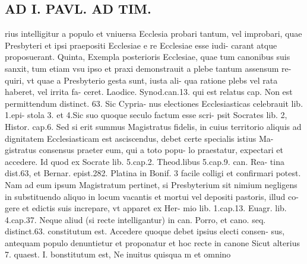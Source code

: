 \documentclass{article}
\begin{document}
\begin{pages}
\section*{AD I. PAVL. AD TIM. }
\marginpar{[ p.113 ]}\pstart rius intelligitur a populo et vniuersa Ecclesia probari tantum, vel improbari, quae Presbyteri et ipsi praepositi Ecclesiae e re Ecclesiae esse iudi- carant atque proposuerant. Quinta, Exempla posterioris Ecclesiae, quae tum canonibus suis sanxit, tum etiam vsu ipso et praxi demonstrauit a plebe tantum assensum re- quiri, vt quae a Presbyterio gesta sunt, iusta ali- qua ratione plebs vel rata haberet, vel irrita fa- ceret. Laodice. Synod.can.13. qui est relatus cap. Non est permittendum distinct. 63. Sic Cypria- nus electiones Ecclesiasticas celebrauit lib. 1.epi- stola 3. et 4.Sic suo quoque seculo factum esse scri- psit Socrates lib. 2, Histor. cap.6. Sed si erit summus Magistratus fidelis, in cuius territorio aliquis ad dignitatem Ecclesiasticam est asciscendus, debet certe specialis istius Ma- gistratus consensus praeter eum, qui a toto popu- lo praestatur, expectari et accedere. Id quod ex Socrate lib. 5.cap.2. Theod.libus 5.cap.9. can. Rea- tina dist.63, et Bernar. epist.282. Platina in Bonif. 3 facile colligi et confirmari potest. Nam ad eum ipsum Magistratum pertinet, si Presbyterium sit nimium negligens in substituendo aliquo in locum vacantis et mortui vel depositi pastoris, illud co- gere et edictis suis increpare, vt apparet ex Her- mio lib. 1.cap.13. Euagr. lib. 4.cap.37. Neque aliud (si recte intelligantur) in can. Porro, et cano. seq. distinct.63. constitutum est. Accedere quoque debet ipsius electi consen- sus, antequam populo denuntietur et proponatur et hoc recte in canone Sicut alterius 7. quaest. I. bonstitutum est, Ne inuitus quisqua m et omnino  \pend

\end{pages}
\end{document}
